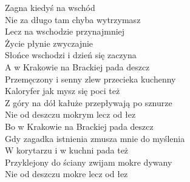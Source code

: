 \documentclass[a5paper, 10pt]{book}
\begin{document}
\begin{minipage}[t]{0.8\textwidth}
  Zagna kiedyś na wschód\\
  Nie za długo tam chyba wytrzymasz\\
  Lecz na wschodzie przynajmniej\\
  Życie płynie zwyczajnie\\
  Słońce wschodzi i dzień się zaczyna\vspace*{2mm}\\
  \hspace*{5mm}A w Krakowie na Brackiej pada deszcz\\
  \hspace*{5mm}Przemęczony i senny zlew przecieka kuchenny\\
  \hspace*{5mm}Kaloryfer jak mysz się poci też\\
  \hspace*{5mm}Z góry na dół kałuże przepływają po sznurze\\
  \hspace*{5mm}Nie od deszczu mokrym lecz od łez\vspace*{2mm}\\
  \hspace*{5mm}Bo w Krakowie na Brackiej pada deszcz\\
  \hspace*{5mm}Gdy zagadka istnienia zmusza mnie do myślenia\\
  \hspace*{5mm}W korytarzu i w kuchni pada też\\
  \hspace*{5mm}Przyklejony do ściany zwijam mokre dywany\\
  \hspace*{5mm}Nie od deszczu mokre lecz od łez\vspace*{2mm}\\
\end{minipage}
\end{document}
